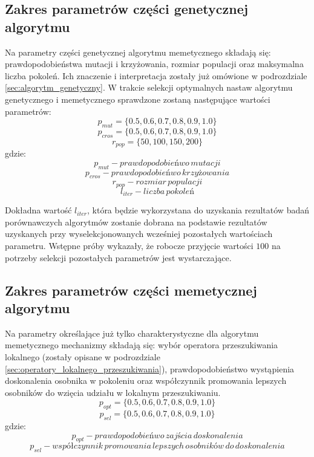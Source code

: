 \subsection{Zakres parametrów części genetycznej algorytmu}
%
Na parametry części genetycznej algorytmu memetycznego składają się: prawdopodobieństwa mutacji i krzyżowania, rozmiar populacji oraz maksymalna liczba pokoleń. Ich znaczenie i interpretacja zostały już omówione w podrozdziale \ref{sec:algorytm_genetyczny}. W trakcie selekcji optymalnych nastaw algorytmu genetycznego i memetycznego sprawdzone zostaną następujące wartości parametrów:
\[p_{mut} = \lbrace0.5, 0.6, 0.7, 0.8, 0.9, 1.0\rbrace\]
\[p_{cros} = \lbrace0.5, 0.6, 0.7, 0.8, 0.9, 1.0\rbrace\]
\[r_{pop}=\lbrace50, 100, 150, 200\rbrace\]
gdzie:
\[p_{mut} - prawdopodobieńwo\, mutacji\]
\[p_{cros} - prawdopodobieńwo\, krzyżowania\]
\[r_{pop} - rozmiar\, populacji\]
\[l_{iter} - liczba\, pokoleń\]

Dokładna wartość $l_{iter}$, która będzie wykorzystana do uzyskania rezultatów badań porównawczych algorytmów zostanie dobrana na podstawie rezultatów uzyskanych przy wyselekcjonowanych wcześniej pozostałych wartościach parametru. Wstępne próby wykazały, że robocze przyjęcie wartości $100$ na potrzeby selekcji pozostałych parametrów jest wystarczające.




\subsection{Zakres parametrów części memetycznej algorytmu}
Na parametry określające już tylko charakterystyczne dla algorytmu memetycznego mechanizmy składają się: wybór operatora przeszukiwania lokalnego (zostały opisane w podrozdziale \ref{sec:operatory_lokalnego_przeszukiwania}), prawdopodobieństwo wystąpienia doskonalenia osobnika w pokoleniu oraz współczynnik promowania lepszych osobników do wzięcia udziału w lokalnym przeszukiwaniu. 
\[p_{opt} = \lbrace0.5, 0.6, 0.7, 0.8, 0.9, 1.0\rbrace\]
\[p_{sel} = \lbrace0.5, 0.6, 0.7, 0.8, 0.9, 1.0\rbrace\]
gdzie:
\[p_{opt} - prawdopodobieńwo\,zajścia\, doskonalenia\]
\[p_{sel} - współczynnik\, promowania\, lepszych\, osobników\, do\, doskonalenia\]

